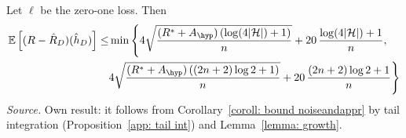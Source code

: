 \documentclass[reqno]{amsart}
\begin{document}
\begin{theorem}\label{thm: bound noiseandappr}
  Let $\ell$ be the zero-one loss. Then
\begin{equation*}
\begin{split}
\expv\left[(R-\hat R_D)(\hat h_D)\right] \le &\min\Bigg\{ 4\sqrt{\frac{(R^*+A_{\hyp})\left(\log (4\card)+1\right)}{n}} + 20\,\frac{\log(4\card)+1}{n}, \\
&4\sqrt{\frac{(R^*+A_{\hyp})\left((2n+2)\log 2+1\right)}{n}} + 20\,\frac{(2n+2)\log 2+1}{n} \Bigg\}
\end{split}
\end{equation*}
\textnormal{\emph{Source.} Own result: it follows from Corollary~\ref{coroll: bound noiseandappr} by tail integration (Proposition~\ref{app: tail int}) and Lemma~\ref{lemma: growth}.}


\end{theorem}
\end{document}
